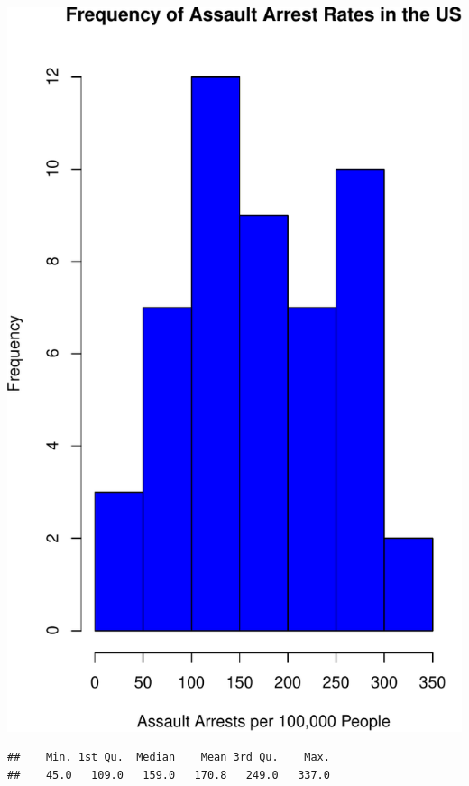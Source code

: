 \documentclass[
]{article}
\newenvironment{Shaded}{\begin{snugshade}}{\end{snugshade}}
\newcommand{\FunctionTok}[1]{\textcolor[rgb]{0.00,0.00,0.00}{#1}}
\newcommand{\NormalTok}[1]{#1}
\newcommand{\SpecialCharTok}[1]{\textcolor[rgb]{0.00,0.00,0.00}{#1}}
\begin{document}
\includegraphics{Assignments_files/figure-latex/unnamed-chunk-9-1.pdf}

\begin{Shaded}
\end{Shaded}

\begin{verbatim}
##    Min. 1st Qu.  Median    Mean 3rd Qu.    Max. 
##    45.0   109.0   159.0   170.8   249.0   337.0
\end{verbatim}
\end{document}
